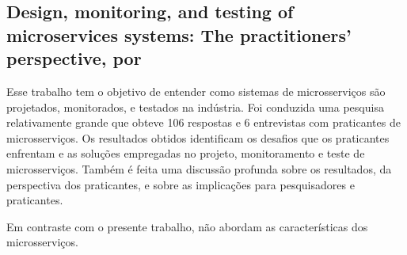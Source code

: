 \subsection{Design, monitoring, and testing of microservices systems: The practitioners’ perspective, por }

Esse trabalho tem o objetivo de entender como sistemas de microsserviços são projetados, monitorados, e testados na indústria. Foi conduzida uma pesquisa relativamente grande que obteve 106 respostas e 6 entrevistas com praticantes de microsserviços. Os resultados obtidos identificam os desafios que os praticantes enfrentam e as soluções empregadas no projeto, monitoramento e teste de microsserviços. Também é feita uma discussão profunda sobre os resultados, da perspectiva dos praticantes, e sobre as implicações para pesquisadores e praticantes.

Em contraste com o presente trabalho,  não abordam as características dos microsserviços.



